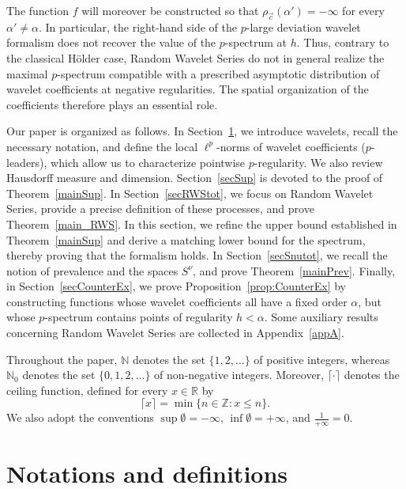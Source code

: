 \documentclass[a4paper,11pt,oneside]{article}
\theoremstyle{definition}
\theoremstyle{plain}
\begin{document}
The function $f$ will moreover be constructed so that
$\rho_{\vec{c}}(\alpha')=-\infty$ for every $\alpha'\neq\alpha$. In particular, the right-hand side of the $p$-large deviation wavelet formalism does not recover the value of the $p$-spectrum at $h$. Thus, contrary to the classical H\"older case, Random Wavelet Series do not in general realize the maximal $p$-spectrum compatible with a prescribed asymptotic distribution of wavelet coefficients at negative regularities. The spatial organization of the coefficients therefore plays an essential role.




\medskip


Our paper is organized as follows. In Section~\ref{secNot}, we introduce wavelets, recall the necessary notation, and define the local $\ell^p$-norms of wavelet coefficients ($p$-leaders), which allow us to characterize pointwise $p$-regularity. We also review Hausdorff measure and dimension. Section~\ref{secSup} is devoted to the proof of Theorem~\ref{mainSup}. In Section~\ref{secRWStot}, we focus on Random Wavelet Series, provide a precise definition of these processes, and prove Theorem~\ref{main_RWS}. In this section, we refine the upper bound established in Theorem~\ref{mainSup} and derive a matching lower bound for the spectrum, thereby proving that the formalism holds. In Section~\ref{secSnutot}, we recall the notion of prevalence and the spaces $S^\nu$, and prove Theorem~\ref{mainPrev}. Finally, in Section~\ref{secCounterEx}, we prove Proposition~\ref{prop:CounterEx} by constructing functions whose wavelet coefficients all have a fixed order $\alpha$, but whose $p$-spectrum contains points of regularity $h<\alpha$. Some auxiliary results concerning Random Wavelet Series are collected in Appendix~\ref{appA}.

Throughout the paper, $\mathbb{N}$ denotes the set $\{1,2,\ldots\}$ of positive integers, whereas $\mathbb{N}_0$ denotes the set $\{0,1,2,\ldots\}$ of non-negative integers. Moreover, $\lceil \cdot \rceil$ denotes the ceiling function, defined for every $x\in\mathbb{R}$ by
\[
\lceil x \rceil = \min\{n\in\mathbb{Z}:x\leq n\}.
\]
We also adopt the conventions
$\sup\emptyset=-\infty$, $\inf\emptyset=+\infty$, and $\frac{1}{+\infty}=0.$


\section{Notations and definitions}\label{secNot}
\end{document}
